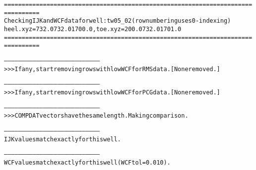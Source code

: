 \begin{alltt}
================================================================================
Checking IJK and WCF data for well: tw05_02 (row numbering uses 0-indexing)
heel.xyz = 732.0 732.0 1700.0, toe.xyz = 200.0 732.0 1701.0
================================================================================

--------------------------------------------------------------------------------
>>> If any, start removing rows with low WCF for RMS data. [None removed.]

--------------------------------------------------------------------------------
>>> If any, start removing rows with low WCF for PCG data. [None removed.]

--------------------------------------------------------------------------------
>>> COMPDAT vectors have the same length. Making comparison.

--------------------------------------------------------------------------------
IJK values match exactly for this well.

--------------------------------------------------------------------------------
WCF values match exactly for this well (WCF tol = 0.010).
\end{alltt}
